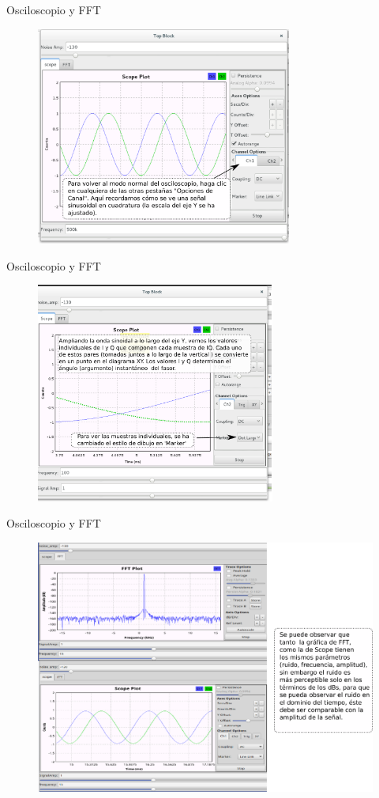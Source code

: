 \begin{frame}{Osciloscopio y FFT}
\begin{figure}[H]
\vspace{-3mm}
\centering
\includegraphics[width=0.75\textwidth]{parte1/lab2/pdf/lab2_14.pdf}
\end{figure}
\end{frame}

\begin{frame}{Osciloscopio y FFT}
\begin{figure}[H]
\vspace{-3mm}
\centering
\includegraphics[width=0.7\textwidth]{parte1/lab2/pdf/lab2_15.pdf}
\end{figure}
\end{frame}

\begin{frame}{Osciloscopio y FFT}
\begin{figure}[H]
\centering
\includegraphics[width=\textwidth, height=0.58\textwidth]{parte1/lab2/pdf/lab2_16.pdf}
\end{figure}
\end{frame}

